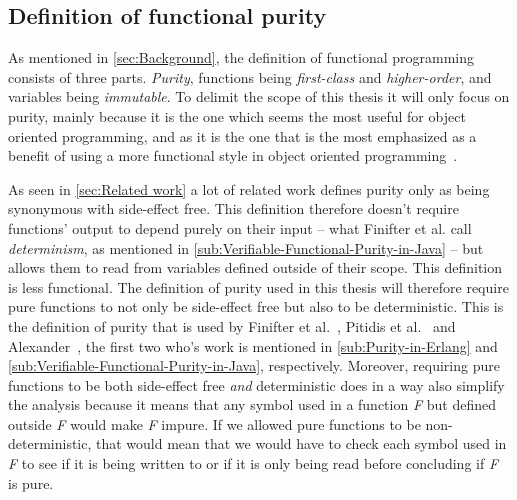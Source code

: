 \documentclass[a4paper,12pt]{article}
\begin{document}

\subsection{Definition of functional purity} \label{sub:Definition of functional purity}
As mentioned in \autoref{sec:Background}, the definition of functional programming consists of three parts. \textit{Purity}, functions being \textit{first-class} and \textit{higher-order}, and variables being \textit{immutable}. To delimit the scope of this thesis it will only focus on purity, mainly because it is the one which seems the most useful for object oriented programming, and as it is the one that is the most emphasized as a benefit of using a more functional style in object oriented programming~\cite{alvin-alexander}. %

As seen in \autoref{sec:Related work} a lot of related work defines purity only as being synonymous with side-effect free. This definition therefore doesn't require functions' output to depend purely on their input -- what Finifter et al. call \textit{determinism}, as mentioned in \autoref{sub:Verifiable-Functional-Purity-in-Java} -- but allows them to read from variables defined outside of their scope. This definition is less functional. The definition of purity used in this thesis will therefore require pure functions to not only be side-effect free but also to be deterministic. This is the definition of purity that is used by Finifter et al.~\cite{purity-in-java}, Pitidis et al.~\cite{pitidis2010purity} and Alexander~\cite{alvin-alexander}, %
the first two who's work is mentioned in \autoref{sub:Purity-in-Erlang} and \autoref{sub:Verifiable-Functional-Purity-in-Java}, respectively. Moreover, requiring pure functions to be both side-effect free \textit{and} deterministic does in a way also simplify the analysis because it means that any symbol used in a function \textit{F} but defined outside \textit{F} would make \textit{F} impure. If we allowed pure functions to be non-deterministic, that would mean that we would have to check each symbol used in \textit{F} to see if it is being written to or if it is only being read before concluding if \textit{F} is pure.
\end{document}
